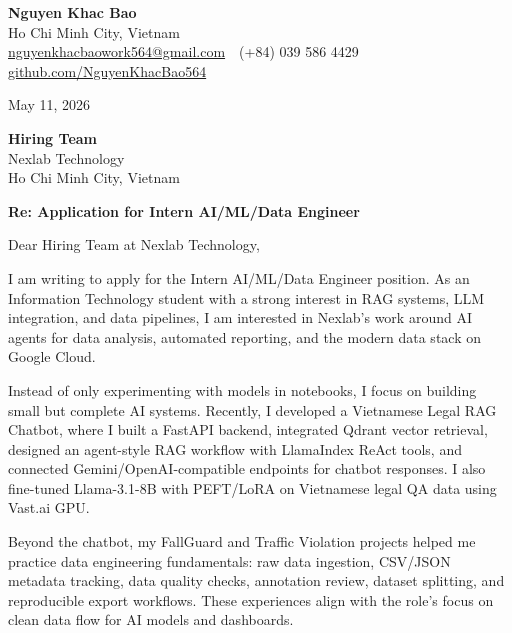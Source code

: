 \documentclass[11pt,a4paper]{article}
\begin{document}
\begin{flushleft}
\textbf{Nguyen Khac Bao}\\
Ho Chi Minh City, Vietnam\\
\href{mailto:nguyenkhacbaowork564@gmail.com}{nguyenkhacbaowork564@gmail.com} \,\textbullet\,
(+84) 039 586 4429 \,\textbullet\,
\href{https://github.com/NguyenKhacBao564}{github.com/NguyenKhacBao564}
\end{flushleft}

\vspace{4pt}
\hfill May 11, 2026

\vspace{8pt}

\begin{flushleft}
\textbf{Hiring Team}\\
Nexlab Technology\\
Ho Chi Minh City, Vietnam
\end{flushleft}

\vspace{4pt}

\textbf{Re: Application for Intern AI/ML/Data Engineer}

\vspace{8pt}

Dear Hiring Team at Nexlab Technology,

I am writing to apply for the Intern AI/ML/Data Engineer position. As an Information Technology student with a strong interest in RAG systems, LLM integration, and data pipelines, I am interested in Nexlab's work around AI agents for data analysis, automated reporting, and the modern data stack on Google Cloud.

Instead of only experimenting with models in notebooks, I focus on building small but complete AI systems. Recently, I developed a Vietnamese Legal RAG Chatbot, where I built a FastAPI backend, integrated Qdrant vector retrieval, designed an agent-style RAG workflow with LlamaIndex ReAct tools, and connected Gemini/OpenAI-compatible endpoints for chatbot responses. I also fine-tuned Llama-3.1-8B with PEFT/LoRA on Vietnamese legal QA data using Vast.ai GPU.

Beyond the chatbot, my FallGuard and Traffic Violation projects helped me practice data engineering fundamentals: raw data ingestion, CSV/JSON metadata tracking, data quality checks, annotation review, dataset splitting, and reproducible export workflows. These experiences align with the role's focus on clean data flow for AI models and dashboards.
\end{document}
